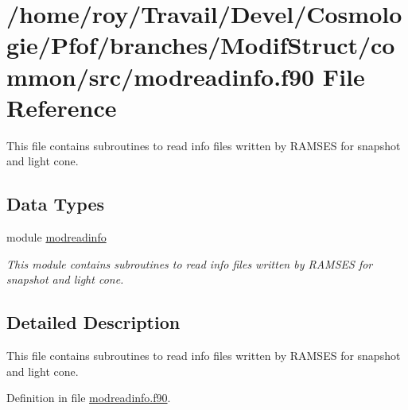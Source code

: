 \hypertarget{modreadinfo_8f90}{\section{/home/roy/\-Travail/\-Devel/\-Cosmologie/\-Pfof/branches/\-Modif\-Struct/common/src/modreadinfo.f90 File Reference}
\label{modreadinfo_8f90}
}


This file contains subroutines to read info files written by R\-A\-M\-S\-E\-S for snapshot and light cone.  


\subsection*{Data Types}
\begin{DoxyCompactItemize}
\item 
module \hyperlink{classmodreadinfo}{modreadinfo}
\begin{DoxyCompactList}\small\item\em This module contains subroutines to read info files written by R\-A\-M\-S\-E\-S for snapshot and light cone. \end{DoxyCompactList}\end{DoxyCompactItemize}


\subsection{Detailed Description}
This file contains subroutines to read info files written by R\-A\-M\-S\-E\-S for snapshot and light cone. 

Definition in file \hyperlink{modreadinfo_8f90_source}{modreadinfo.\-f90}.

